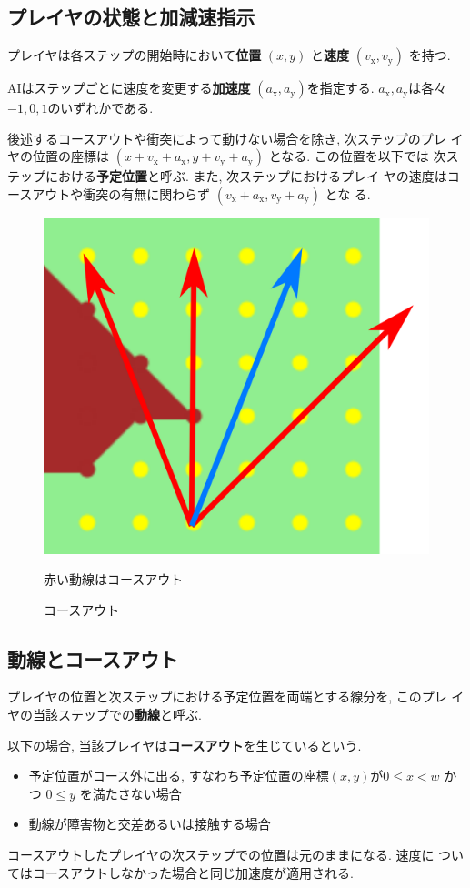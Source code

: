 \documentclass[11pt]{jarticle}
\begin{document}
\subsection{プレイヤの状態と加減速指示}
プレイヤは各ステップの開始時において{\bf 位置} $(x, y)$ と{\bf 速度}
$(v_\mathrm{x}, v_\mathrm{y})$ を持つ.

AIはステップごとに速度を変更する{\bf 加速度} $(a_\mathrm{x}, a_\mathrm{y})$を指定する.
$a_\mathrm{x}, a_\mathrm{y}$は各々$-1, 0, 1$のいずれかである.

後述するコースアウトや衝突によって動けない場合を除き, 次ステップのプレ
イヤの位置の座標は $(x+v_\mathrm{x}+a_\mathrm{x}, y+v_\mathrm{y}+a_\mathrm{y})$ となる. この位置を以下では
次ステップにおける{\bf 予定位置}と呼ぶ. また, 次ステップにおけるプレイ
ヤの速度はコースアウトや衝突の有無に関わらず $(v_\mathrm{x}+a_\mathrm{x}, v_\mathrm{y}+a_\mathrm{y})$ とな
る.

\begin{figure}
  \vspace{-1cm}
  \centering
  \includegraphics[width=0.26\columnwidth, natwidth=1358, natheight=1181]{courseout.png}
  \caption{コースアウト}
  \label{fig:courseout}
  赤い動線はコースアウト
  \vspace{-1cm}
\end{figure}

\subsection{動線とコースアウト}

プレイヤの位置と次ステップにおける予定位置を両端とする線分を, このプレ
イヤの当該ステップでの{\bf 動線}と呼ぶ.

以下の場合, 当該プレイヤは{\bf コースアウト}を生じているという.
\begin{itemize}
\item
  予定位置がコース外に出る, すなわち予定位置の座標$(x,y)$が$0 \le x <
  w$ かつ $0 \le y$ を満たさない場合
\item
  動線が障害物と交差あるいは接触する場合
\end{itemize}
コースアウトしたプレイヤの次ステップでの位置は元のままになる.  速度に
ついてはコースアウトしなかった場合と同じ加速度が適用される.
\end{document}
